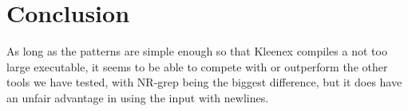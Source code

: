 \section{Conclusion}
As long as the patterns are simple enough so that Kleenex compiles a not too
large executable, it seems to be able to compete with or outperform the other
tools we have tested, with NR-grep being the biggest difference, but it does
have an unfair advantage in using the input with newlines.
